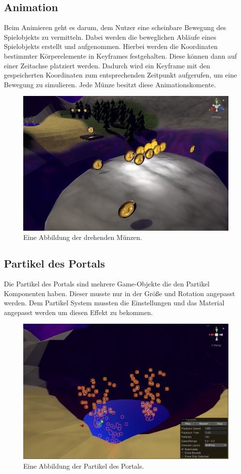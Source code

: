\pagebreak
\subsection{Animation}

Beim Animieren geht es darum, dem Nutzer eine scheinbare Bewegung des Spielobjekts zu vermitteln. Dabei werden die beweglichen Abläufe eines Spielobjekts erstellt und aufgenommen. Hierbei werden die Koordinaten bestimmter Körperelemente in Keyframes festgehalten. Diese können dann auf einer Zeitachse platziert werden. Dadurch wird ein Keyframe mit den gespeicherten Koordinaten zum entsprechenden Zeitpunkt aufgerufen, um eine Bewegung zu simulieren. Jede Münze besitzt diese Animationskomente.

\begin{figure}[H]
  \centering
  \includegraphics[width=0.5\linewidth]{chapters/14/Images/Animation.png}
  \caption{Eine Abbildung der drehenden Münzen.}
  \label{U06}
\end{figure}

\subsection{Partikel des Portals}

Die Partikel des Portals sind mehrere Game-Objekte die den Partikel Komponenten haben. Dieser musste nur in der Größe und Rotation angepasst werden. Dem Partikel System mussten die Einstellungen und das Material angepasst werden um diesen Effekt zu bekommen.

\begin{figure}[H]
  \centering
  \includegraphics[width=0.5\linewidth]{chapters/14/Images/Partikel.png}
  \caption{Eine Abbildung der Partikel des Portals.}
  \label{U07}
\end{figure}